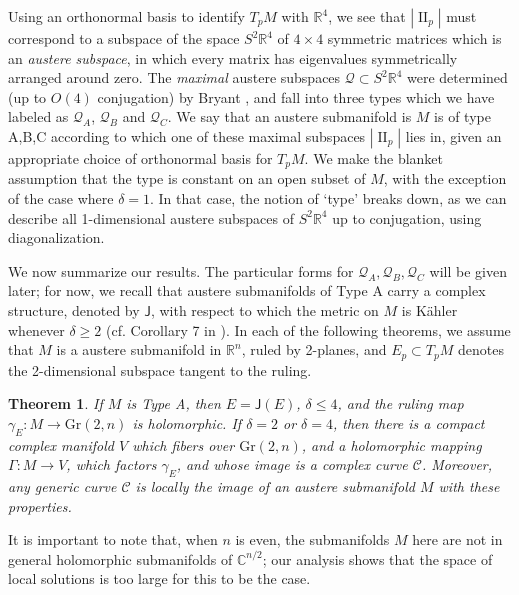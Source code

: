 \documentclass[12pt,reqno]{amsart}
\newtheorem{theorem}{Theorem}
\theoremstyle{definition}
\theoremstyle{remark}
\begin{document}
Using an orthonormal basis to identify $T_pM$ with ${\mathbb R}^4$, we see that $|{\operatorname{II}}_p|$ must correspond
to a subspace of the space $S^2 {\mathbb R}^4$ of $4\times 4$ symmetric
matrices which is an {\em austere subspace}, in which every matrix has eigenvalues symmetrically arranged around zero.
The {\em maximal} austere subspaces ${\mathcal Q} \subset S^2 {\mathbb R}^4$ were determined (up to $O(4)$ conjugation) by Bryant \cite{Baustere},
and fall into three types which we have labeled as ${\mathcal Q}_A$, ${\mathcal Q}_B$ and ${\mathcal Q}_C$.
We say that an austere submanifold is $M$ is of type A,B,C
according to which one of these maximal subspaces $|{\operatorname{II}}_p|$  lies in, given an appropriate choice of orthonormal basis for $T_pM$.
We make the blanket assumption that the type is constant on an open subset of $M$, with
the exception of the case where $\delta=1$.  In that case, the notion of `type' breaks down,
as we can describe
all 1-dimensional austere subspaces of $S^2 {\mathbb R}^4$ up to conjugation, using diagonalization.

We now summarize our results.
The particular forms for ${\mathcal Q}_A, {\mathcal Q}_B, {\mathcal Q}_C$ will be given later; for now, we recall that
austere submanifolds of Type A carry a complex structure, denoted by ${\mathsf J}$, with
respect to which the metric on $M$ is K\"ahler whenever $\delta \ge 2$ (cf. Corollary 7 in \cite{ayeaye}).
In each of the following theorems,
we assume that $M$ is a austere submanifold in ${\mathbb R}^n$,
ruled by 2-planes, and $E_p \subset T_p M$ denotes the 2-dimensional subspace tangent to the ruling.

\begin{theorem}  If $M$ is Type A, then $E={\mathsf J}(E)$, $\delta \le 4$,
and the ruling map $\gamma_E: M \to {{\mathrm{Gr}}}(2,n)$ is holomorphic.
If $\delta=2$ or $\delta=4$, then there is a compact complex manifold $V$ which fibers
over ${{\mathrm{Gr}}}(2,n)$, and a holomorphic mapping $\Gamma: M\to V$, which factors $\gamma_E$, and whose image is a
complex curve  ${\mathscr C}$.  Moreover, any generic curve ${\mathscr C}$ is locally the image of
an austere submanifold $M$ with these properties.
\end{theorem}

It is important to note that, when $n$ is even, the submanifolds $M$ here
are not in general holomorphic submanifolds of ${\mathbb C}^{n/2}$; our analysis shows that the space
of local solutions is too large for this to be the case.
\end{document}
